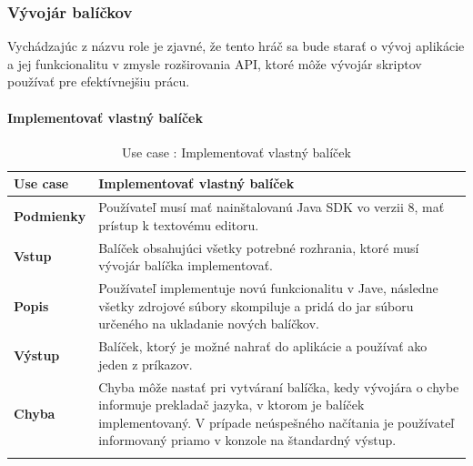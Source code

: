 \subsubsection{Vývojár balíčkov}
\indent Vychádzajúc z názvu role je zjavné, že tento hráč sa bude starať o vývoj aplikácie a jej funkcionalitu v zmysle rozširovania API, ktoré môže vývojár skriptov používať pre efektívnejšiu prácu.
\paragraph{Implementovať vlastný balíček}
\begin{center}
	\begin{longtable}{|p{2.5cm}|p{12.2cm}|}
		
			\hline
			\textbf{Use case} & Implementovať vlastný balíček \\ 
			\hline
			\textbf{Podmienky} & Používateľ musí mať nainštalovanú Java SDK vo verzii 8, mať prístup k textovému editoru.  \\ 
			\hline
			\textbf{Vstup} & Balíček obsahujúci všetky potrebné rozhrania, ktoré musí vývojár balíčka implementovať.\\
			\hline
			\textbf{Popis} & Používateľ implementuje novú funkcionalitu v Jave, následne všetky zdrojové súbory skompiluje a pridá do \acrshort{jar} súboru určeného na ukladanie nových balíčkov.\\ 
			\hline
			\textbf{Výstup} & Balíček, ktorý je možné nahrať do aplikácie a používať ako jeden z príkazov.\\
			\hline
			\textbf{Chyba} & Chyba môže nastať pri vytváraní balíčka, kedy vývojára o chybe informuje prekladač jazyka, v ktorom je balíček implementovaný. V prípade neúspešného načítania je používateľ informovaný priamo v konzole na štandardný výstup.\\
			\hline
		\caption{Use case : Implementovať vlastný balíček}
		\label{table:1}
		
	\end{longtable}
\end{center}

